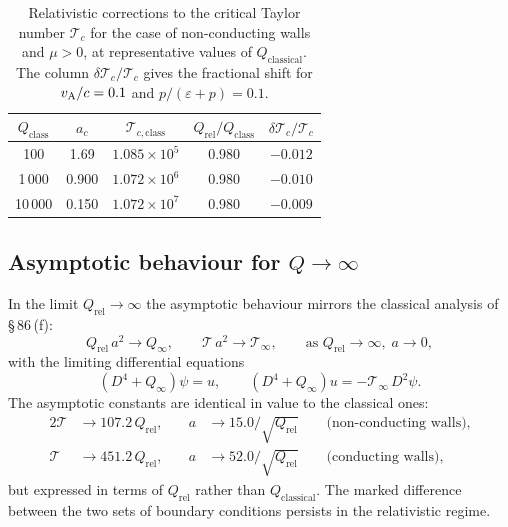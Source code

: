 \begin{table}[ht]
\centering
\caption{Relativistic corrections to the critical Taylor number
  $\mathscr{T}_c$ for the case of non-conducting walls and $\mu>0$,
  at representative values of $Q_{\mathrm{classical}}$.  The column
  $\delta\mathscr{T}_c/\mathscr{T}_c$ gives the fractional shift
  for $v_{\mathrm{A}}/c = 0.1$ and $p/(\varepsilon+p) = 0.1$.}
\label{tab:rel-XLII}
\begin{tabular}{ccccc}
\hline
$Q_{\mathrm{class}}$ & $a_c$ & $\mathscr{T}_{c,\mathrm{class}}$
  & $Q_{\mathrm{rel}}/Q_{\mathrm{class}}$
  & $\delta\mathscr{T}_c/\mathscr{T}_c$ \\
\hline
   100 & 1.69  & $1.085\times10^5$ & 0.980 & $-0.012$ \\
 1\,000 & 0.900 & $1.072\times10^6$ & 0.980 & $-0.010$ \\
10\,000 & 0.150 & $1.072\times10^7$ & 0.980 & $-0.009$ \\
\hline
\end{tabular}
\end{table}

\subsection{Asymptotic behaviour for $Q\to\infty$}
\label{sec:rel-88-asymptotic}

In the limit $Q_{\mathrm{rel}}\to\infty$ the asymptotic behaviour
mirrors the classical analysis of \S\,86\,(f):
\begin{equation}
  Q_{\mathrm{rel}}\,a^2 \to Q_\infty,\qquad
  \mathscr{T}\,a^2 \to \mathscr{T}_\infty,
  \qquad\text{as } Q_{\mathrm{rel}}\to\infty,\; a\to 0,
  \label{eq:rel-9-258R}
\end{equation}
with the limiting differential equations
\begin{equation}
  (D^4 + Q_\infty)\psi = u,\qquad
  (D^4 + Q_\infty)u = -\mathscr{T}_\infty\,D^2\psi.
  \label{eq:rel-9-259R}
\end{equation}
The asymptotic constants are identical in value to the classical ones:
\begin{alignat}{2}
  \mathscr{T} &\to 107.2\,Q_{\mathrm{rel}},\quad
  & a &\to 15.0/\sqrt{Q_{\mathrm{rel}}}
  \qquad\text{(non-conducting walls),}
  \label{eq:rel-9-266aR}\\[4pt]
  \mathscr{T} &\to 451.2\,Q_{\mathrm{rel}},\quad
  & a &\to 52.0/\sqrt{Q_{\mathrm{rel}}}
  \qquad\text{(conducting walls),}
  \label{eq:rel-9-266bR}
\end{alignat}
but expressed in terms of $Q_{\mathrm{rel}}$ rather than
$Q_{\mathrm{classical}}$.  The marked difference between the two sets of
boundary conditions persists in the relativistic regime.

